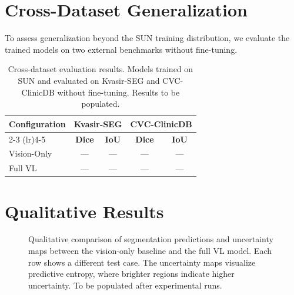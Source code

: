 \section{Cross-Dataset Generalization}
\label{sec:eval:crossdataset}

To assess generalization beyond the SUN training distribution, we evaluate the trained models on two external benchmarks without fine-tuning.

\begin{table}[htbp]
	\caption{Cross-dataset evaluation results. Models trained on SUN and evaluated on Kvasir-SEG and CVC-ClinicDB without fine-tuning. Results to be populated.}
	\label{tab:cross_dataset}
	\centering
	\begin{tabular}{lcccc}
		\toprule
		\multirow{2}{*}{\textbf{Configuration}} & \multicolumn{2}{c}{\textbf{Kvasir-SEG}} & \multicolumn{2}{c}{\textbf{CVC-ClinicDB}} \\
		\cmidrule(lr){2-3} \cmidrule(lr){4-5}
		& \textbf{Dice} & \textbf{IoU} & \textbf{Dice} & \textbf{IoU} \\
		\midrule
		Vision-Only & ---  & ---  & ---  & ---  \\
		Full VL     & ---  & ---  & ---  & ---  \\
		\bottomrule
	\end{tabular}
\end{table}

\section{Qualitative Results}
\label{sec:eval:qualitative}

\begin{figure}[htbp]
	\centering
	\caption[Qualitative segmentation and uncertainty comparison.]{Qualitative comparison of segmentation predictions and uncertainty maps between the vision-only baseline and the full VL model. Each row shows a different test case. The uncertainty maps visualize predictive entropy, where brighter regions indicate higher uncertainty. To be populated after experimental runs.}
	\label{fig:qualitative}
\end{figure}

